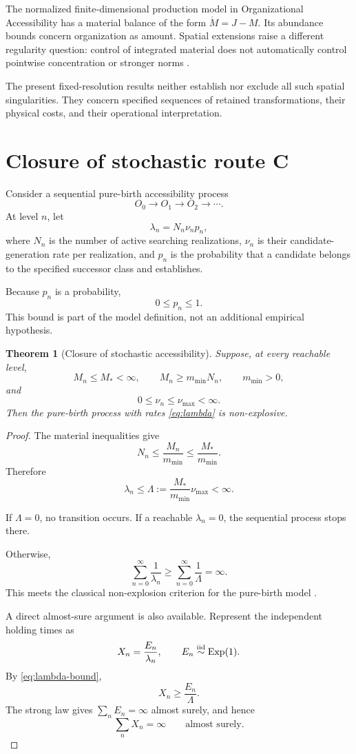 \documentclass[11pt,a4paper]{article}
\newtheorem{theorem}{Theorem}[section]
\theoremstyle{definition}
\numberwithin{equation}{section}
\begin{document}
The normalized finite-dimensional production model in
Organizational Accessibility has a material balance of the form
$\dot M=J-M$. Its abundance bounds concern organization as amount.
Spatial extensions raise a different regularity question:
control of integrated material does not automatically control
pointwise concentration or stronger norms
\cite{PierreSchmitt1997}.

The present fixed-resolution results neither establish nor exclude
all such spatial singularities. They concern specified sequences of
retained transformations, their physical costs, and their operational
interpretation.


\section{Closure of stochastic route C}

Consider a sequential pure-birth accessibility process
\[
O_0\longrightarrow O_1\longrightarrow O_2\longrightarrow\cdots.
\]
At level $n$, let
\begin{equation}
\lambda_n=N_n\nu_np_n,
\label{eq:lambda}
\end{equation}
where $N_n$ is the number of active searching realizations,
$\nu_n$ is their candidate-generation rate per realization, and
$p_n$ is the probability that a candidate belongs to the specified
successor class and establishes.

Because $p_n$ is a probability,
\[
0\le p_n\le1.
\]
This bound is part of the model definition, not an additional
empirical hypothesis.

\begin{theorem}[Closure of stochastic accessibility]
\label{thm:C}
Suppose, at every reachable level,
\[
M_n\le M_*<\infty,
\qquad
M_n\ge m_{\min}N_n,
\qquad
m_{\min}>0,
\]
and
\[
0\le\nu_n\le\nu_{\max}<\infty.
\]
Then the pure-birth process with rates \eqref{eq:lambda} is
non-explosive.
\end{theorem}

\begin{proof}
The material inequalities give
\[
N_n\le\frac{M_n}{m_{\min}}
\le\frac{M_*}{m_{\min}}.
\]
Therefore
\begin{equation}
\lambda_n\le
\Lambda:=
\frac{M_*}{m_{\min}}\nu_{\max}<\infty.
\label{eq:lambda-bound}
\end{equation}

If $\Lambda=0$, no transition occurs. If a reachable
$\lambda_n=0$, the sequential process stops there.

Otherwise,
\[
\sum_{n=0}^{\infty}\frac1{\lambda_n}
\ge
\sum_{n=0}^{\infty}\frac1\Lambda
=\infty.
\]
This meets the classical non-explosion criterion for the pure-birth
model \cite{Feller1971}.

A direct almost-sure argument is also available. Represent the
independent holding times as
\[
X_n=\frac{E_n}{\lambda_n},
\qquad
E_n\overset{\rm iid}{\sim}{\rm Exp}(1).
\]
By \eqref{eq:lambda-bound},
\[
X_n\ge\frac{E_n}{\Lambda}.
\]
The strong law gives $\sum_nE_n=\infty$ almost surely, and hence
\[
\sum_nX_n=\infty
\qquad\text{almost surely}.
\]
\end{proof}
\end{document}
